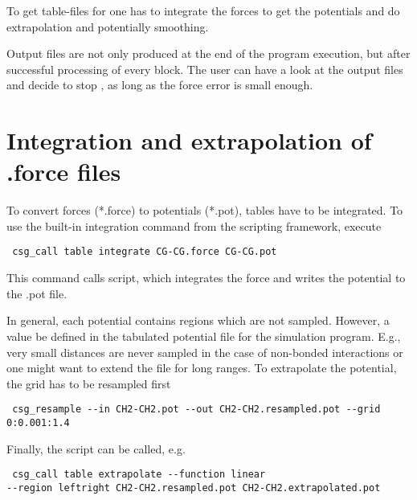 To get table-files for \gromacs one has to integrate the forces to get the potentials and do extrapolation and potentially smoothing.

Output files are not only produced at the end of the program execution, but after successful processing of every block. The user can have a look at the output files and decide to stop , as long as the force error is small enough.

\section{Integration and extrapolation of .force files }
To convert forces (*.force) to potentials (*.pot), tables have to be integrated. To use the built-in integration command from the scripting framework, execute
\begin{verbatim}
 csg_call table integrate CG-CG.force CG-CG.pot
\end{verbatim}

This command calls  script, which integrates the force and writes the potential to the .pot file.

In general, each potential contains regions which are not sampled. However, a value be defined in the tabulated potential file for the simulation program. E.g., very small distances are never sampled in the case of non-bonded interactions or one might want to extend the file for long ranges. To extrapolate the potential, the grid has to be resampled first
\begin{verbatim}
 csg_resample --in CH2-CH2.pot --out CH2-CH2.resampled.pot --grid 0:0.001:1.4
\end{verbatim}

Finally, the  script can be called, e.g.
\begin{verbatim}
 csg_call table extrapolate --function linear
--region leftright CH2-CH2.resampled.pot CH2-CH2.extrapolated.pot
\end{verbatim}
